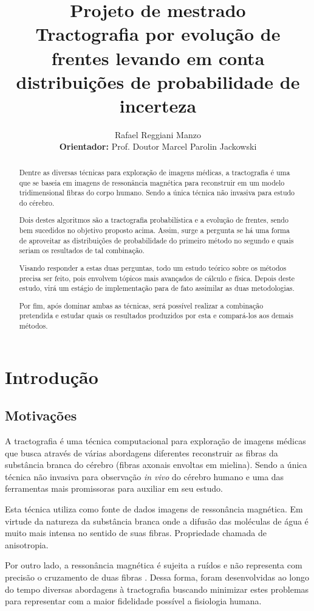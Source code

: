 \documentclass[a4paper,11pt]{report}
\title{Projeto de mestrado\\
       \textbf{Tractografia por evolução de frentes levando em conta distribuições de probabilidade de incerteza}}
\author{Rafael Reggiani Manzo\\
        \textbf{Orientador:} Prof. Doutor Marcel Parolin Jackowski}
\begin{document}
\maketitle
\tableofcontents

\begin{abstract}
Dentre as diversas técnicas para exploração de imagens médicas, a tractografia é uma que se baseia em imagens de ressonância magnética para reconstruir em um modelo tridimensional fibras do corpo humano. Sendo a única técnica não invasiva para estudo do cérebro.

Dois destes algoritmos são a tractografia probabilística e a evolução de frentes, sendo bem sucedidos no objetivo proposto acima. Assim, surge a pergunta se há uma forma de aproveitar as distribuições de probabilidade do primeiro método no segundo e quais seriam os resultados de tal combinação.

Visando responder a estas duas perguntas, todo um estudo teórico sobre os métodos precisa ser feito, pois envolvem tópicos mais avançados de cálculo e física. Depois deste estudo, virá um estágio de implementação para de fato assimilar as duas metodologias.

Por fim, após dominar ambas as técnicas, será possível realizar a combinação pretendida e estudar quais os resultados produzidos por esta e compará-los aos demais métodos.
\end{abstract}

\chapter{Introdução}
  \section{Motivações}
  A tractografia é uma técnica computacional para exploração de imagens médicas que busca através de várias abordagens diferentes reconstruir as fibras da substância branca do cérebro (fibras axonais envoltas em mielina). Sendo a única técnica não invasiva para observação \textit{in vivo} do cérebro humano e uma das ferramentas mais promissoras para auxiliar em seu estudo.
  
  Esta técnica utiliza como fonte de dados imagens de ressonância magnética. Em virtude da natureza da substância branca onde a difusão das moléculas de água é muito mais intensa no sentido de suas fibras. Propriedade chamada de anisotropia.
  
  Por outro lado, a ressonância magnética é sujeita a ruídos e não representa com precisão o cruzamento de duas fibras . Dessa forma, foram desenvolvidas ao longo do tempo diversas abordagens à tractografia buscando minimizar estes problemas para representar com a maior fidelidade possível a fisiologia humana.
  
\end{document}
